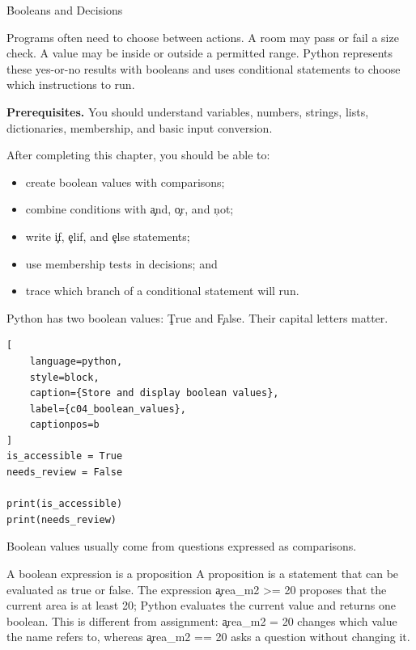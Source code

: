 
\h{Booleans and Decisions}
\label{ch:04}

Programs often need to choose between actions. A room may pass or fail a size
check. A value may be inside or outside a permitted range. Python represents
these yes-or-no results with booleans and uses conditional statements to choose
which instructions to run.

\begin{NoteBox}
\textbf{Prerequisites.} You should understand variables, numbers, strings,
lists, dictionaries, membership, and basic input conversion.
\end{NoteBox}

\begin{tcolorbox}[title=Learning outcomes,colframe=orange,colback=white,arc=2mm]
After completing this chapter, you should be able to:
\begin{itemize}
    \item create boolean values with comparisons;
    \item combine conditions with \c{and}, \c{or}, and \c{not};
    \item write \c{if}, \c{elif}, and \c{else} statements;
    \item use membership tests in decisions; and
    \item trace which branch of a conditional statement will run.
\end{itemize}
\end{tcolorbox}


Python has two boolean values: \c{True} and \c{False}. Their capital letters
matter.

\begin{lstlisting}[
    language=python,
    style=block,
    caption={Store and display boolean values},
    label={c04_boolean_values},
    captionpos=b
]
is_accessible = True
needs_review = False

print(is_accessible)
print(needs_review)
\end{lstlisting}

Boolean values usually come from questions expressed as comparisons.

\begin{ExplainBox}{A boolean expression is a proposition}
A proposition is a statement that can be evaluated as true or false. The
expression \c{area_m2 >= 20} proposes that the current area is at least 20;
Python evaluates the current value and returns one boolean. This is different
from assignment: \c{area_m2 = 20} changes which value the name refers to,
whereas \c{area_m2 == 20} asks a question without changing it.
\end{ExplainBox}

